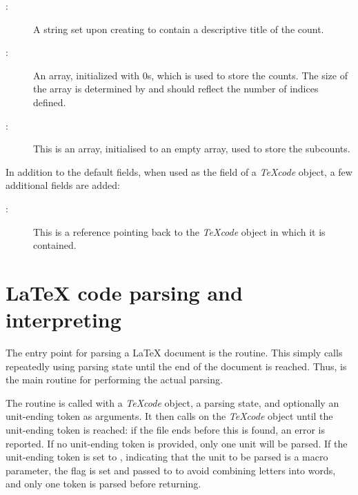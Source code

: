 \documentclass{article}
\newcommand\Obj[1]{\textsl{#1}}
\newcommand\wild{\ldots}
\begin{document}
\begin{description}

\item[:] A string set upon creating to contain a descriptive title of the count.

\item[:] An array, initialized with 0s, which is used to store the counts. The size of the array is determined by  and should reflect the number of \code{\$CNT_\wild} indices defined.

\item[:] This is an array, initialised to an empty array, used to store the subcounts.

\end{description}

In addition to the default fields, when used as the  field of a \Obj{TeXcode} object, a few additional fields are added:

\begin{description}

\item[:] This is a reference pointing back to the \Obj{TeXcode} object in which it is contained.

\end{description}



\section{\LaTeX{} code parsing and interpreting}

The entry point for parsing a \LaTeX{} document is the  routine. This simply calls  repeatedly using parsing state  until the end of the document is reached. Thus,  is the main routine for performing the actual parsing.

The  routine is called with a \Obj{TeXcode} object, a parsing state, and optionally an unit-ending token as arguments. It then calls  on the \Obj{TeXcode} object until the unit-ending token is reached: if the file ends before this is found, an error is reported. If no unit-ending token is provided, only one unit will be parsed. If the unit-ending token is set to , indicating that the unit to be parsed is a macro parameter, the  flag is set and passed to  to avoid combining letters into words, and only one token is parsed before returning.
\end{document}
